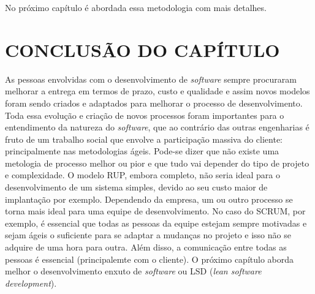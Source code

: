 No próximo capítulo é abordada essa metodologia com mais detalhes. 

\section{CONCLUSÃO DO CAPÍTULO}

As pessoas envolvidas com o desenvolvimento de \textit{software} sempre procuraram melhorar a entrega em termos de prazo, custo e qualidade e assim novos modelos foram sendo criados e adaptados para melhorar o processo de desenvolvimento. Toda essa evolução e criação de novos processos foram importantes para o entendimento da natureza do \textit{software}, que ao contrário das outras engenharias é fruto de um trabalho social que envolve a participação massiva do cliente: principalmente nas metodologias ágeis. Pode-se dizer que não existe uma metologia de processo melhor ou pior e que tudo vai depender do tipo de projeto e complexidade. O modelo RUP, embora completo, não seria ideal para o desenvolvimento de um sistema simples, devido ao seu custo maior de implantação por exemplo. Dependendo da empresa, um ou outro processo se torna mais ideal para uma equipe de desenvolvimento. No caso do SCRUM, por exemplo, é essencial que todas as pessoas da equipe estejam sempre motivadas e sejam ágeis o suficiente para se adaptar a mudanças no projeto e isso não se adquire de uma hora para outra. Além disso, a comunicação entre todas as pessoas é essencial (principalemte com o cliente). O próximo capítulo aborda melhor o desenvolvimento enxuto de \textit{software} ou LSD (\textit{lean software development}).
